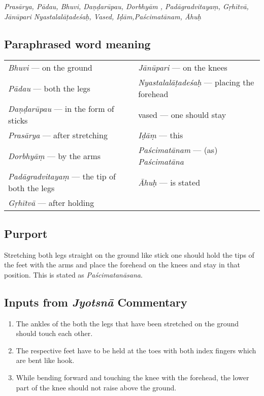 \textit{Prasārya, Pādau, Bhuvi, Daṇḍarūpau, Dorbhyām , Padāgradvitayaṃ, Gṛhītvā, Jānūpari Nyastalalāṭadeśaḥ,  Vased, Iḍām,Paścimatānam, Āhuḥ}

\subsection*{Paraphrased word meaning}
\vspace{-10pt}

\begin{longtable}{>{\noindent\raggedright}p{5cm}>{\noindent\raggedright}p{5cm}}
\textit{Bhuvi} --- on the ground & \textit{Jānūpari} --- on the knees\tabularnewline
\textit{Pādau} --- both the legs  & \textit{Nyastalalāṭadeśaḥ} --- placing the forehead\tabularnewline
\textit{Daṇḍarūpau} --- in the form of sticks  & vased --- one should stay\tabularnewline
\textit{Prasārya} --- after stretching  & \textit{Iḍāṃ} --- this\tabularnewline
\textit{Dorbhyāṃ} --- by the arms  & \textit{Paścimatānam} --- (as) \textit{Paścimatāna}\tabularnewline
\textit{Padāgradvitayaṃ} --- the tip of both the legs  & \textit{Āhuḥ} --- is stated \tabularnewline
\textit{Gṛhītvā} --- after holding & 
\end{longtable}
\vspace{-10pt}

\subsection*{Purport}

Stretching both legs straight on the ground like stick one should hold the tips of the feet with the arms and place the forehead on the knees and stay in that position. This is stated as \textit{Paścimatanāsana}.
\vspace{-10pt}

\subsection*{Inputs from \textit{Jyotsnā} Commentary}
\vspace{-10pt}

\begin{enumerate}
\itemsep=0pt
\item The ankles of the both the legs that have been stretched on the ground should touch each other. 
\item The respective feet have to be held at the toes with both index fingers which are bent like hook.  
\item While bending forward and touching the knee with the forehead, the lower part of the knee should not raise above the ground.
\end{enumerate}
\vspace{-10pt}

